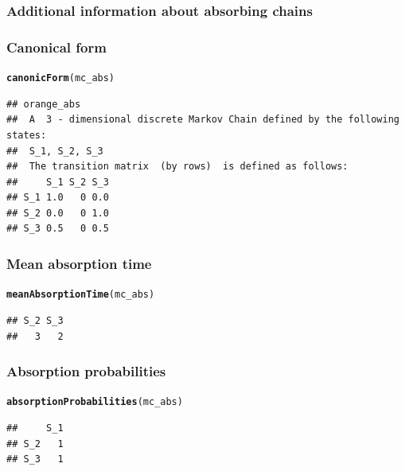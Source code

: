 \documentclass[aspectratio=169]{beamer}\usepackage[]{graphicx}\usepackage[]{xcolor}
\makeatletter
\newcommand{\hldef}[1]{\textcolor[rgb]{0.345,0.345,0.345}{#1}}%
\newcommand{\hlkwd}[1]{\textcolor[rgb]{0.737,0.353,0.396}{\textbf{#1}}}%
\newenvironment{kframe}{%
 \def\at@end@of@kframe{}%
 \ifinner\ifhmode%
  \def\at@end@of@kframe{\end{minipage}}%
  \begin{minipage}{\columnwidth}%
 \fi\fi%
 \def\FrameCommand##1{\hskip\@totalleftmargin \hskip-\fboxsep
 \colorbox{shadecolor}{##1}\hskip-\fboxsep
     \hskip-\linewidth \hskip-\@totalleftmargin \hskip\columnwidth}%
 \MakeFramed {\advance\hsize-\width
   \@totalleftmargin\z@ \linewidth\hsize
   \@setminipage}}%
 {\par\unskip\endMakeFramed%
 \at@end@of@kframe}
\newenvironment{knitrout}{}{} %
\makeatother
\begin{document}

\begin{frame}\frametitle{Additional information about absorbing chains}
\vfill
{}
\vfill
{}
\vfill
{}
\end{frame}

\begin{frame}[fragile]\frametitle{Canonical form}
\begin{knitrout}
\color{fgcolor}\begin{kframe}
\begin{alltt}
\hlkwd{canonicForm}\hldef{(mc_abs)}
\end{alltt}
\begin{verbatim}
## orange_abs 
##  A  3 - dimensional discrete Markov Chain defined by the following states: 
##  S_1, S_2, S_3 
##  The transition matrix  (by rows)  is defined as follows: 
##     S_1 S_2 S_3
## S_1 1.0   0 0.0
## S_2 0.0   0 1.0
## S_3 0.5   0 0.5
\end{verbatim}
\end{kframe}
\end{knitrout}
\end{frame}

\begin{frame}[fragile]\frametitle{Mean absorption time}
\begin{knitrout}
\color{fgcolor}\begin{kframe}
\begin{alltt}
\hlkwd{meanAbsorptionTime}\hldef{(mc_abs)}
\end{alltt}
\begin{verbatim}
## S_2 S_3 
##   3   2
\end{verbatim}
\end{kframe}
\end{knitrout}
\end{frame}

\begin{frame}[fragile]\frametitle{Absorption probabilities}
\begin{knitrout}
\color{fgcolor}\begin{kframe}
\begin{alltt}
\hlkwd{absorptionProbabilities}\hldef{(mc_abs)}
\end{alltt}
\begin{verbatim}
##     S_1
## S_2   1
## S_3   1
\end{verbatim}
\end{kframe}
\end{knitrout}
\end{frame}
\end{document}

